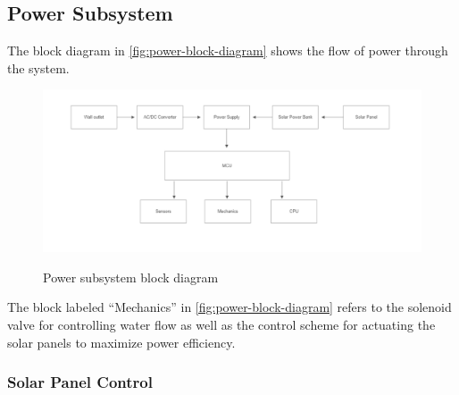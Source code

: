 \subsection{Power Subsystem}
The block diagram in \autoref{fig:power-block-diagram} shows the flow of power through the system. 
\begin{figure}[H]
    \centering
    \caption{Power subsystem block diagram}
    \includegraphics[width=\textwidth]{images/PowerSystemBlock.png}
    \label{fig:power-block-diagram}
\end{figure}
The block labeled ``Mechanics'' in \autoref{fig:power-block-diagram} refers to the solenoid valve for controlling water flow as well as the control scheme for actuating the solar panels to maximize power efficiency.
\subsubsection{Solar Panel Control}